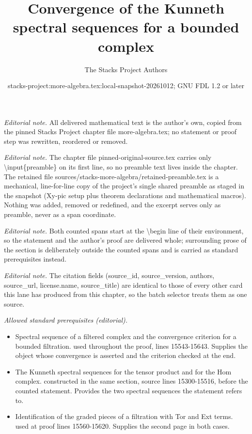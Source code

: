 \documentclass[10pt,a4paper]{amsart}
\title{Convergence of the Kunneth spectral sequences for a bounded complex}
\author{The Stacks Project Authors}
\date{stacks-project:more-algebra.tex:local-snapshot-20261012; GNU FDL 1.2 or later}
\theoremstyle{plain}
\theoremstyle{definition}
\theoremstyle{remark}
\numberwithin{equation}{subsection}
\begin{document}
\maketitle
\setcounter{subsection}{1}
\noindent\textit{Editorial note.} All delivered mathematical text is the author's own, copied from the pinned Stacks Project chapter file more-algebra.tex; no statement or proof step was rewritten, reordered or removed.\par\medskip
\noindent\textit{Editorial note.} The chapter file pinned-original-source.tex carries only \textbackslash{}input\{preamble\} on its first line, so no preamble text lives inside the chapter. The retained file sources/stacks-more-algebra/retained-preamble.tex is a mechanical, line-for-line copy of the project's single shared preamble as staged in the snapshot (Xy-pic setup plus theorem declarations and mathematical macros). Nothing was added, removed or redefined, and the excerpt serves only as preamble, never as a span coordinate.\par\medskip
\noindent\textit{Editorial note.} Both counted spans start at the \textbackslash{}begin line of their environment, so the statement and the author's proof are delivered whole; surrounding prose of the section is deliberately outside the counted spans and is carried as standard prerequisites instead.\par\medskip
\noindent\textit{Editorial note.} The citation fields (source\_id, source\_version, authors, source\_url, license.name, source\_title) are identical to those of every other card this lane has produced from this chapter, so the batch selector treats them as one source.\par\medskip
\noindent\textit{Allowed standard prerequisites (editorial).}\begin{itemize}
\item Spectral sequence of a filtered complex and the convergence criterion for a bounded filtration. used throughout the proof, lines 15543-15643. Supplies the object whose convergence is asserted and the criterion checked at the end.
\item The Kunneth spectral sequences for the tensor product and for the Hom complex. constructed in the same section, source lines 15300-15516, before the counted statement. Provides the two spectral sequences the statement refers to.
\item Identification of the graded pieces of a filtration with Tor and Ext terms. used at proof lines 15560-15620. Supplies the second page in both cases.
\end{itemize}\medskip
\end{document}
